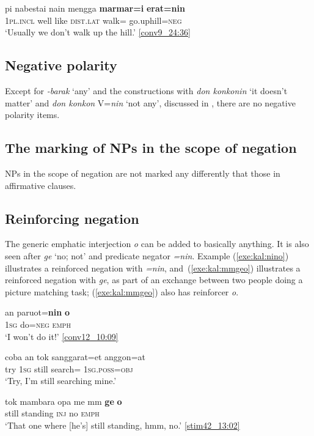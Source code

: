 \documentclass[output=paper,colorlinks,citecolor=brown,draft]{langscibook}
\begin{document}
\ea 	\label{exe:kal:marmarieratnin}
\gll pi nabestai nain mengga \textbf{marmar=i} \textbf{erat=nin}\\
\textsc{1pl.incl} well like \textsc{dist.lat} walk={\gli} go.uphill=\textsc{neg} \\
\glt	`Usually we don't walk up the hill.' {\href{http://hdl.handle.net/10050/00-0000-0000-0004-1B9F-F}{[conv9\_24:36]}}
\z 


\subsection{Negative polarity}
\label{sec:negpol}
Except for \textit{-barak} `any' and the constructions with \textit{don konkonin} `it doesn't matter' and \textit{don konkon} V=\textit{nin} `not any', discussed in , there are no negative polarity items.

\subsection{The marking of NPs in the scope of negation}
\label{sec:nps}
NPs in the scope of negation are not marked any differently that those in affirmative clauses.

\subsection{Reinforcing negation}
\label{sec:reinfneg}
The generic emphatic interjection \textit{o} can be added to basically anything. It is also seen after \textit{ge} `no; not' and predicate negator \textit{=nin}. Example (\ref{exe:kal:nino}) illustrates a reinforced negation with \textit{=nin}, and~(\ref{exe:kal:mmgeo}) illustrates a reinforced negation with \textit{ge}, as part of an exchange between two people doing a picture matching task; (\ref{exe:kal:mmgeo}) also has reinforcer \textit{o}.


\ea 	\label{exe:kal:nino}
\gll an paruot=\textbf{nin} \textbf{o}\\
\textsc{1sg} do=\textsc{neg} \textsc{emph}\\
\glt 		`I won't do it!' {\href{http://hdl.handle.net/10050/00-0000-0000-0004-1BBD-5}{[conv12\_10:09]}}
\z 

\ea 	\label{exe:kal:mmgeo}
\begin{xlist} 
	{\gll coba an tok sanggarat=et anggon=at\\
		try \textsc{1sg} still search={\glet} \textsc{1sg.poss=obj}\\
		\glt `Try, I'm still searching mine.'
	}
	{\gll tok mambara opa me mm \textbf{ge} \textbf{o}\\
		still standing {\glopa} {\glme} \textsc{inj} no \textsc{emph}\\
		\glt `That one where [he's] still standing, hmm, no.' {\href{http://hdl.handle.net/10050/00-0000-0000-0004-1BE7-5}{[stim42\_13:02]}}
		
	}
\end{xlist}
\z 
\end{document}
